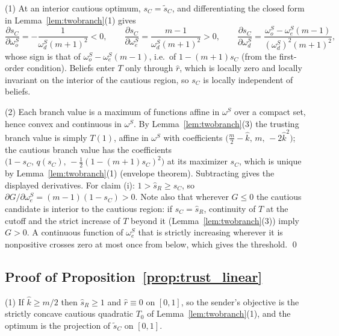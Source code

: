 \documentclass[11pt]{article}
\theoremstyle{plain}
\theoremstyle{remark}
\begin{document}
(1) At an interior cautious optimum, $s_C=\tilde s_C$, and differentiating the closed form in Lemma~\ref{lem:twobranch}(1) gives
\[
        \frac{\partial s_C}{\partial\omega_o^S}=-\frac{1}{\omega_d^S(m+1)^2}<0,
        \qquad
        \frac{\partial s_C}{\partial\omega_e^S}=\frac{m-1}{\omega_d^S(m+1)^2}>0,
        \qquad
        \frac{\partial s_C}{\partial\omega_d^S}=\frac{\omega_o^S-\omega_e^S(m-1)}{(\omega_d^S)^2(m+1)^2},
\]
whose sign is that of $\omega_o^S-\omega_e^S(m-1)$, i.e.\ of $1-(m+1)s_C$ (from the first-order condition).  Beliefs enter $T$ only through $\hat r$, which is locally zero and locally invariant on the interior of the cautious region, so $s_C$ is locally independent of beliefs.

(2) Each branch value is a maximum of functions affine in $\omega^S$ over a compact set, hence convex and continuous in $\omega^S$.  By Lemma~\ref{lem:twobranch}(3) the trusting branch value is simply $T(1)$, affine in $\omega^S$ with coefficients $\big(\tfrac m2-\hat k,\,m,\,-2\hat k^2\big)$; the cautious branch value has the coefficients $\big(1-s_C,\,q(s_C),\,-\tfrac12(1-(m+1)s_C)^2\big)$ at its maximizer $s_C$, which is unique by Lemma~\ref{lem:twobranch}(1) (envelope theorem).  Subtracting gives the displayed derivatives.  For claim (i): $1>\hat s_R\ge s_C$, so $\partial G/\partial\omega_e^S=(m-1)(1-s_C)>0$.  Note also that wherever $G\le0$ the cautious candidate is interior to the cautious region: if $s_C=\hat s_R$, continuity of $T$ at the cutoff and the strict increase of $T$ beyond it (Lemma~\ref{lem:twobranch}(3)) imply $G>0$.  A continuous function of $\omega_e^S$ that is strictly increasing wherever it is nonpositive crosses zero at most once from below, which gives the threshold.
\qed

\subsection*{Proof of Proposition~\ref{prop:trust_linear}}

(1) If $\hat k\ge m/2$ then $\hat s_R\ge1$ and $\hat r\equiv0$ on $[0,1]$, so the sender's objective is the strictly concave cautious quadratic $T_0$ of Lemma~\ref{lem:twobranch}(1), and the optimum is the projection of $\tilde s_C$ on $[0,1]$.
\end{document}
